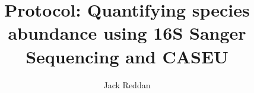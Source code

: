 \documentclass[twocolumn]{article}
\begin{document}
\title{Protocol: Quantifying species abundance using 16S Sanger Sequencing and CASEU}
\author{Jack Reddan}

\maketitle{}

\tableofcontents{}





\end{document}

